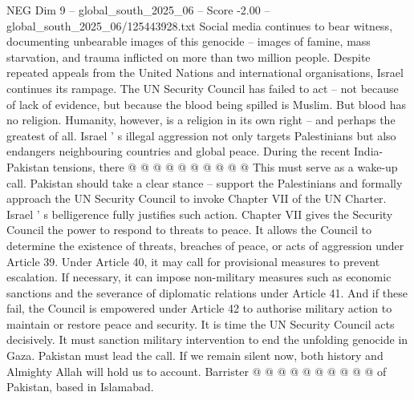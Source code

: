 \begin{textsample}{NEG Dim 9 – global\_south\_2025\_06 – Score -2.00 – global\_south\_2025\_06/125443928.txt}
Social media continues to bear witness, documenting unbearable images of this genocide -- images of famine, mass starvation, and trauma inflicted on more than two million people.
Despite repeated appeals from the United Nations and international organisations, Israel continues its rampage.
The UN Security Council has failed to act -- not because of lack of evidence, but because the blood being spilled is Muslim.
But blood has no religion.
Humanity, however, is a religion in its own right -- and perhaps the greatest of all.
Israel ' s illegal aggression not only targets Palestinians but also endangers neighbouring countries and global peace.
During the recent India-Pakistan tensions, there @ @ @ @ @ @ @ @ @ @ This must serve as a wake-up call.
Pakistan should take a clear stance -- support the Palestinians and formally approach the UN Security Council to invoke Chapter VII of the UN Charter.
Israel ' s belligerence fully justifies such action.
Chapter VII gives the Security Council the power to respond to threats to peace.
It allows the Council to determine the existence of threats, breaches of peace, or acts of aggression under Article 39.
Under Article 40, it may call for provisional measures to prevent escalation.
If necessary, it can impose non-military measures such as economic sanctions and the severance of diplomatic relations under Article 41.
And if these fail, the Council is empowered under Article 42 to authorise military action to maintain or restore peace and security.
It is time the UN Security Council acts decisively.
It must sanction military intervention to end the unfolding genocide in Gaza.
Pakistan must lead the call.
If we remain silent now, both history and Almighty Allah will hold us to account.
Barrister @ @ @ @ @ @ @ @ @ @ of Pakistan, based in Islamabad.

\end{textsample}
